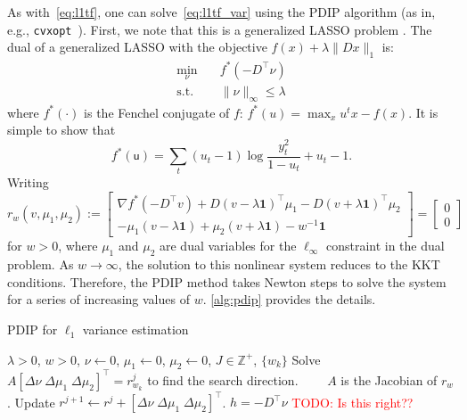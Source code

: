 \documentclass{article}
\newcommand{\attn}[1]{\textcolor{red}{TODO: #1}}
\newcommand{\one}{\mathbf{1}}
\begin{document}
As with~\eqref{eq:l1tf}, one can solve~\eqref{eq:l1tf_var} using the PDIP algorithm (as in, e.g., \texttt{cvxopt}~\citep{andersen_cvxopt:_2013}). First, we note that this is a generalized LASSO problem \citep{tibshirani_solution_2011}. The dual of a generalized LASSO with the objective $f(x)+\lambda \lVert Dx \lVert_1$ is: 
\begin{align}
\min_\nu&\quad f^*(-D^\top\nu) \\
\mbox{s.t.}&\quad \lVert \nu \lVert_\infty \le \lambda
\end{align}
 where $f^*(\cdot)$ is the Fenchel conjugate of $f$: $f^*(u)=\max_x u^tx-f(x)$. It is simple to show that 
\begin{equation}
f^*(\mathsf{u})=\sum_t (u_t-1)\log\frac{y_t^2}{1-u_t} + u_t-1.
\label{eq:conj}
\end{equation}
Writing
\[
  r_w(v,\mu_1,\mu_2):=
  \begin{bmatrix}
    \nabla f^*(-D^\top v) + D(v-\lambda \one)^\top \mu_1 -
    D(v+\lambda \one)^\top \mu_2\\
    -\mu_1(v-\lambda\one)+\mu_2(v + \lambda\one) -w^{-1}\one
  \end{bmatrix}
  =
  \begin{bmatrix}
  0\\0\end{bmatrix}
\]
for $w>0$, where $\mu_1$ and $\mu_2$ are dual variables for the $\ell_\infty$ constraint in the dual problem. As $w\rightarrow\infty$, the solution to this nonlinear system reduces to the KKT conditions. Therefore, the PDIP method takes Newton steps to solve the system for a series of increasing values of $w$. \autoref{alg:pdip} provides the details.
\begin{algorithm}
  \caption{PDIP for $\ell_1$ variance estimation}
  \label{alg:pdip}
  \begin{algorithmic}
    \REQUIRE $\lambda>0$, $w>0$, $\nu\leftarrow 0$, $\mu_1\leftarrow 0$, $\mu_2\leftarrow 0$, $J\in\mathbb{Z}^+$, $\{w_k\}$ 
    \STATE Solve $A [\Delta\nu\; \Delta\mu_1\; \Delta\mu_2]^\top=r^j_{w_k}$ to find the search direction.
    \STATE $\quad\quad A$ is the Jacobian of $r_w$.
    \STATE Update $r^{j+1} \leftarrow r^j + [\Delta\nu\; \Delta\mu_1\; \Delta\mu_2]^\top$.
    \ENDFOR
   \ENDFOR
   \RETURN $h=-D^\top\nu$ \attn{Is this right??}
  \end{algorithmic}
\end{algorithm}
\end{document}
